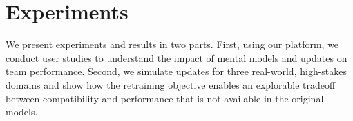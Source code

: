 \documentclass[letterpaper]{article} %
\newcommand{\bug}
    {\mbox{\rule{2mm}{2mm}}}
\newcommand{\Bug}[1]
    {\bug \footnote{BUG: {#1}}}
\newcommand{\?}{\mbox{?}}
\begin{document}


\section{Experiments}
We present experiments and results in two parts. First, using our platform, we conduct user studies to understand the impact of mental models and updates on team performance. Second, we simulate updates for three real-world, high-stakes domains and show how the retraining objective enables an explorable tradeoff between compatibility and performance that is not available in the original models.


\end{document}

